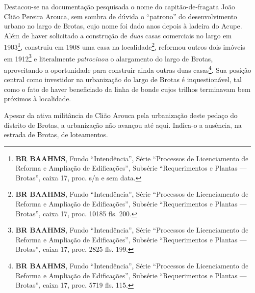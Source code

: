 



Destacou-se na documentação pesquisada o nome do capitão-de-fragata João Clião Pereira Arouca, sem sombra de dúvida o ``patrono'' do desenvolvimento urbano no largo de Brotas, cujo nome foi dado anos depois à ladeira do Acupe. Além de haver solicitado a construção de \textit{duas} casas comerciais no largo em 1903\footnote{\textbf{BR BAAHMS}, Fundo ``Intendência'', Série ``Processos de Licenciamento de Reforma e Ampliação de Edificações'', Subsérie ``Requerimentos e Plantas --- Brotas'', caixa 17, proc. s/n e sem data.}, construiu em 1908 uma casa na localidade\footnote{\textbf{BR BAAHMS}, Fundo ``Intendência'', Série ``Processos de Licenciamento de Reforma e Ampliação de Edificações'', Subsérie ``Requerimentos e Plantas --- Brotas'', caixa 17, proc. 10185 fls. 200.}, reformou outros dois imóveis em 1912\footnote{\textbf{BR BAAHMS}, Fundo ``Intendência'', Série ``Processos de Licenciamento de Reforma e Ampliação de Edificações'', Subsérie ``Requerimentos e Plantas --- Brotas'', caixa 17, proc. 2825 fls. 199.} e literalmente \textit{patrocinou} o alargamento do largo de Brotas, aproveitando a oportunidade para construir ainda outras duas casas\footnote{\textbf{BR BAAHMS}, Fundo ``Intendência'', Série ``Processos de Licenciamento de Reforma e Ampliação de Edificações'', Subsérie ``Requerimentos e Plantas --- Brotas'', caixa 17, proc. 5719 fls. 115.}. Sua posição central como investidor na urbanização do largo de Brotas é inquestionável, tal como o fato de haver beneficiado da linha de bonde cujos trilhos terminavam bem próximos à localidade.


Apesar da ativa militância de Clião Arouca pela urbanização deste pedaço do distrito de Brotas, a urbanização não avançou até aqui. Indica-o a ausência, na estrada de Brotas, de loteamentos. 


